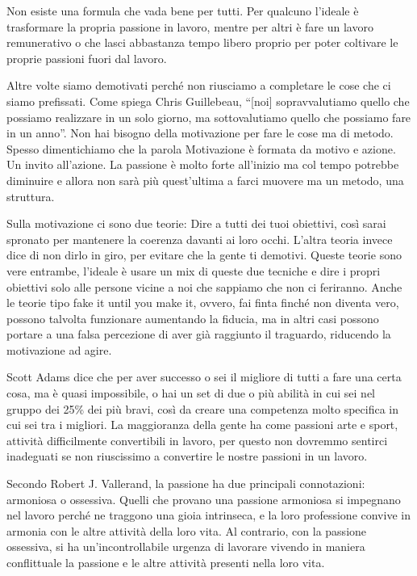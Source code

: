\documentclass[12pt]{book} %
\begin{document}
\begin{mdframed}[linewidth=1pt]
Non esiste una formula che vada bene per tutti. Per qualcuno l'ideale è trasformare la propria
passione in lavoro, mentre per altri è fare un lavoro remunerativo o che lasci abbastanza tempo libero proprio per
poter coltivare le proprie passioni fuori dal lavoro.

Altre volte siamo demotivati perché non riusciamo a completare le cose che ci siamo prefissati. Come spiega Chris
Guillebeau, “[noi] sopravvalutiamo quello che possiamo realizzare in un solo giorno, ma sottovalutiamo quello che
possiamo fare in un anno”. Non hai bisogno della motivazione per fare le cose ma di metodo. Spesso dimentichiamo che la
parola Motivazione è formata da motivo e azione. Un invito all'azione. La passione è molto forte all'inizio ma col tempo potrebbe diminuire e allora
non sarà più quest'ultima a farci muovere ma un metodo, una struttura.

Sulla motivazione ci sono due teorie: 
Dire a tutti dei tuoi obiettivi, così sarai spronato per mantenere la coerenza davanti ai loro occhi.
L'altra teoria invece dice di non dirlo in giro, per evitare che la gente ti demotivi. Queste teorie sono vere entrambe, l'ideale è usare un mix di queste due tecniche e dire i propri obiettivi solo alle persone vicine a noi che sappiamo che non ci feriranno.
Anche le teorie tipo fake it until you make it, ovvero, fai finta finché non diventa vero, possono talvolta funzionare aumentando la fiducia, ma in altri casi possono portare a una falsa percezione di aver già raggiunto il traguardo, riducendo la motivazione ad agire.

Scott Adams dice che per aver successo o sei il migliore di tutti a fare una certa cosa, ma è quasi impossibile, o hai
un set di due o più abilità in cui sei nel gruppo dei 25\% dei più bravi, così da creare una competenza molto specifica
in cui sei tra i migliori. La maggioranza della gente ha come passioni arte e sport, attività difficilmente
convertibili in lavoro, per questo non dovremmo sentirci inadeguati se non riuscissimo a convertire le nostre passioni
in un lavoro.

Secondo Robert J. Vallerand, la passione ha due principali connotazioni: armoniosa o ossessiva. Quelli che provano una
passione armoniosa si impegnano nel lavoro perché ne traggono una gioia intrinseca, e la loro professione convive in
armonia con le altre attività della loro vita. Al contrario, con la passione ossessiva, si ha
un'incontrollabile urgenza di lavorare vivendo in maniera conflittuale la passione e le altre
attività presenti nella loro vita.


\end{mdframed}
\end{document}
